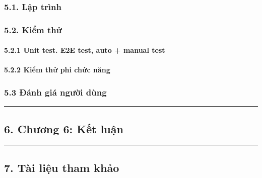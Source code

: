 \documentclass[
]{article}
\begin{document}
\hypertarget{lux1eadp-truxecnh}{%
\subsubsection{\texorpdfstring{5.1. Lập trình
}{5.1. Lập trình }}\label{lux1eadp-truxecnh}}

\hypertarget{kiux1ec3m-thux1eed}{%
\subsubsection{\texorpdfstring{5.2. Kiểm thử
}{5.2. Kiểm thử }}\label{kiux1ec3m-thux1eed}}

\hypertarget{unit-test.-e2e-test-auto-manual-test}{%
\paragraph{\texorpdfstring{5.2.1 Unit test. E2E test, auto + manual test
}{5.2.1 Unit test. E2E test, auto + manual test }}\label{unit-test.-e2e-test-auto-manual-test}}

\hypertarget{kiux1ec3m-thux1eed-phi-chux1ee9c-nux103ng}{%
\paragraph{\texorpdfstring{5.2.2 Kiểm thử phi chức năng
}{5.2.2 Kiểm thử phi chức năng }}\label{kiux1ec3m-thux1eed-phi-chux1ee9c-nux103ng}}

\hypertarget{ux111uxe1nh-giuxe1-ngux1b0ux1eddi-duxf9ng}{%
\subsubsection{\texorpdfstring{5.3 Đánh giá người dùng
}{5.3 Đánh giá người dùng }}\label{ux111uxe1nh-giuxe1-ngux1b0ux1eddi-duxf9ng}}

\begin{center}\rule{0.5\linewidth}{0.5pt}\end{center}

\hypertarget{chux1b0ux1a1ng-6-kux1ebft-luux1eadn}{%
\subsection{\texorpdfstring{6. Chương 6: Kết luận
}{6. Chương 6: Kết luận }}\label{chux1b0ux1a1ng-6-kux1ebft-luux1eadn}}

\begin{center}\rule{0.5\linewidth}{0.5pt}\end{center}

\hypertarget{tuxe0i-liux1ec7u-tham-khux1ea3o}{%
\subsection{\texorpdfstring{7. Tài liệu tham khảo
}{7. Tài liệu tham khảo }}\label{tuxe0i-liux1ec7u-tham-khux1ea3o}}
\end{document}
